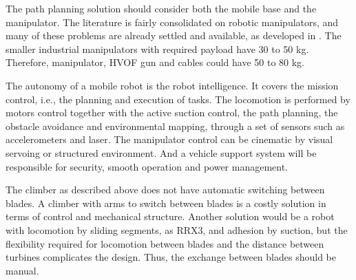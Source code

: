 The path planning solution should consider both the mobile base and the
manipulator. The literature is fairly consolidated on robotic manipulators, and
many of these problems are already settled and available, as developed in
\cite{manzdevelopment}. The smaller industrial manipulators with required
payload have 30 to 50 kg. Therefore, manipulator, HVOF gun and cables could have
50 to 80 kg.



The autonomy of a mobile robot is the robot intelligence. It covers the mission
control, i.e., the planning and execution of tasks. The locomotion is performed
by motors control together with the active suction control, the path planning,
the obstacle avoidance and environmental mapping, through a set of sensors such
as accelerometers and laser. The manipulator control can be cinematic by
visual servoing or structured environment. And a vehicle support system will
be responsible for security, smooth operation and power management.



The climber as described above does not have automatic switching between blades.
A climber with arms to switch between blades is a costly solution in terms
of control and mechanical structure. Another solution would be a robot with
locomotion by sliding segments, as RRX3, and adhesion by suction, but the
flexibility required for locomotion between blades and the distance between
turbines complicates the design. Thus, the exchange between blades should be
manual.


